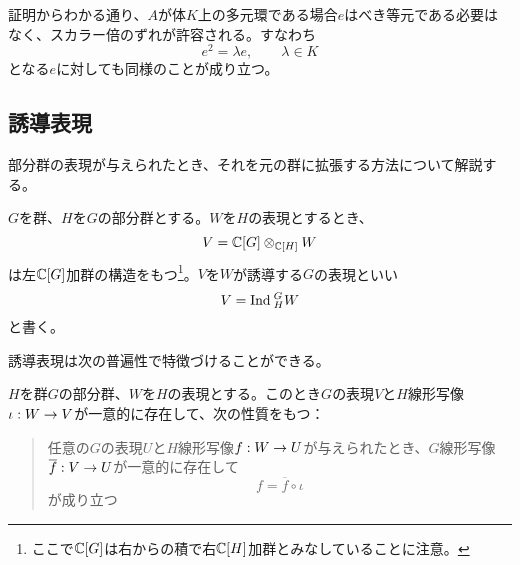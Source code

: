 \documentclass{ltjsreport}
\begin{document}
\begin{notice}
  証明からわかる通り、$A$が体$K$上の多元環である場合$e$はべき等元である必要はなく、スカラー倍のずれが許容される。すなわち
  \[
  e^2=\lambda e,\qquad \lambda\in K
  \]
  となる$e$に対しても同様のことが成り立つ。
\end{notice}




\subsection{誘導表現}

部分群の表現が与えられたとき、それを元の群に拡張する方法について解説する。

\begin{defin}\label{ind_rep}
  $G$を群、$H$を$G$の部分群とする。$W$を$H$の表現とするとき、
  \[
  V=\mathbb{C}[G]\otimes_{\mathbb{C}[H]}W 
  \]
  は左$\mathbb{C}[G]$加群の構造をもつ\footnote{
    ここで$\mathbb{C}[G]$は右からの積で右$\mathbb{C}[H]$加群とみなしていることに注意。}。$V$を$W$が誘導する$G$の表現といい
  \[
  V=\text{Ind}\:_H^GW  
  \]
  と書く。
\end{defin}

誘導表現は次の普遍性で特徴づけることができる。

\begin{theo}[誘導表現の普遍性]\label{univ_ind_rep}
  $H$を群$G$の部分群、$W$を$H$の表現とする。このとき$G$の表現$V$と$H$線形写像$\iota:W\rightarrow V$が一意的に存在して、次の性質をもつ：
  \begin{quote}
    任意の$G$の表現$U$と$H$線形写像$f:W\rightarrow U$が与えられたとき、$G$線形写像$\overline{f}:V\rightarrow U$が一意的に存在して
    \[
    f=\overline{f}\circ\iota  
    \]
    が成り立つ
  \end{quote}
\end{theo}
\end{document}
